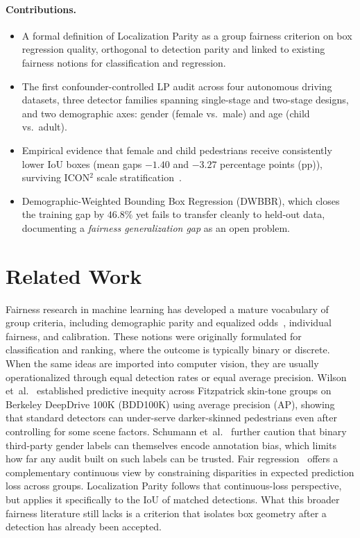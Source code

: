 \documentclass[runningheads]{llncs}
\begin{document}
\paragraph{Contributions.}
\begin{itemize}
\item A formal definition of Localization Parity as a group fairness criterion
      on box regression quality, orthogonal to detection parity and linked to
      existing fairness notions for classification and regression.
\item The first confounder-controlled LP audit across four autonomous driving
      datasets, three detector families spanning single-stage and two-stage
      designs, and two demographic axes: gender (female vs.\ male) and age
      (child vs.\ adult).
\item Empirical evidence that female and child pedestrians receive consistently
      lower IoU boxes (mean gaps $-1.40$ and $-3.27$ percentage points (pp)),
      surviving ICON$^2$ scale stratification~\cite{sudhakar2023icon2}.
\item Demographic-Weighted Bounding Box Regression (DWBBR), which closes the
      training gap by $46.8\%$ yet fails to transfer cleanly to held-out data,
      documenting a \emph{fairness generalization gap} as an open problem.
\end{itemize}

\section{Related Work}
\label{sec:related}

Fairness research in machine learning has developed a mature vocabulary of group
criteria, including demographic parity and equalized
odds~\cite{hardt2016equality}, individual fairness, and calibration. These
notions were originally formulated for classification and ranking, where the
outcome is typically binary or discrete. When the same ideas are imported into
computer vision, they are usually operationalized through equal detection rates
or equal average precision. Wilson et~al.~\cite{wilson2019predictive}
established predictive inequity across Fitzpatrick skin-tone groups on
Berkeley DeepDrive 100K (BDD100K) using average precision (AP), showing that
standard detectors can under-serve darker-skinned pedestrians even after
controlling for some scene factors. Schumann
et~al.~\cite{schumann2021step} further caution that binary third-party gender
labels can themselves encode annotation bias, which limits how far any audit
built on such labels can be trusted. Fair regression~\cite{agarwal2019fair}
offers a complementary continuous view by constraining disparities in expected
prediction loss across groups. Localization Parity follows that continuous-loss
perspective, but applies it specifically to the IoU of matched detections.
What this broader fairness literature still lacks is a criterion that isolates
box geometry after a detection has already been accepted.
\end{document}
